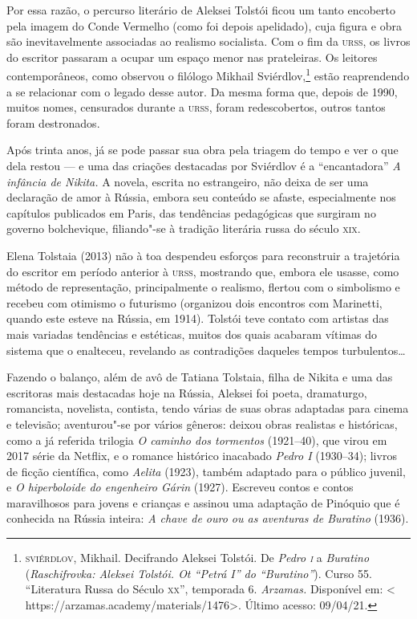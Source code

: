 Por essa razão, o percurso literário de Aleksei Tolstói ficou um tanto
encoberto pela imagem do Conde Vermelho (como foi depois apelidado), cuja
figura e obra são inevitavelmente associadas ao realismo socialista. Com
o fim da \textsc{urss}, os livros do escritor passaram a ocupar um espaço menor nas prateleiras. Os leitores contemporâneos, como observou o
filólogo Mikhail Sviérdlov,\footnote{\textsc{sviérdlov}, Mikhail. Decifrando
  Aleksei Tolstói. De \emph{Pedro \textsc{i}} a \emph{Buratino}
  (\emph{Raschifrovka: Aleksei Tolstói. Ot ``Petrá I'' do
  ``Buratino''}). Curso 55. ``Literatura Russa do Século \textsc{xx}'', temporada
  6. \emph{Arzamas.} Disponível em: \textless{}
  https://arzamas.academy/materials/1476\textgreater{}. Último acesso: 09/04/21.} estão
reaprendendo a se relacionar com o legado desse autor. Da mesma forma
que, depois de 1990, muitos nomes, censurados durante a \textsc{urss}, foram
redescobertos, outros tantos foram destronados.

Após trinta anos, já se pode passar sua obra pela triagem do tempo e ver
o que dela restou --- e uma das criações destacadas por Sviérdlov é a
``encantadora'' \emph{A infância de Nikita.} A novela, escrita no
estrangeiro, não deixa de ser uma declaração de amor à Rússia, embora
seu conteúdo se afaste, especialmente nos capítulos publicados em Paris,
das tendências pedagógicas que surgiram no governo bolchevique,
filiando"-se à tradição literária russa do século \textsc{xix}.

Elena Tolstaia (2013) não à toa despendeu esforços para reconstruir a
trajetória do escritor em período anterior à \textsc{urss}, mostrando que, embora
ele usasse, como método de representação, principalmente o realismo,
flertou com o simbolismo e recebeu com otimismo o futurismo (organizou
dois encontros com Marinetti, quando este esteve na Rússia, em 1914).
Tolstói teve contato com artistas das mais variadas tendências e
estéticas, muitos dos quais acabaram vítimas do sistema que o enalteceu,
revelando as contradições daqueles tempos turbulentos\ldots{}

Fazendo o balanço, além de avô de Tatiana Tolstaia, filha de Nikita e
uma das escritoras mais destacadas hoje na Rússia, Aleksei foi poeta,
dramaturgo, romancista, novelista, contista, tendo várias de suas obras
adaptadas para cinema e televisão; aventurou"-se por vários gêneros:
deixou obras realistas e históricas, como a já referida trilogia \emph{O
caminho dos tormentos} (1921--40), que virou em 2017 série da Netflix, e
o romance histórico inacabado \emph{Pedro I} (1930--34); livros de
ficção científica, como \emph{Aelita} (1923), também adaptado para o
público juvenil, e \emph{O hiperboloide do engenheiro Gárin} (1927).
Escreveu contos e contos maravilhosos para jovens e crianças e assinou
uma adaptação de Pinóquio que é conhecida na Rússia inteira: \emph{A
chave de ouro ou as aventuras de Buratino} (1936).



